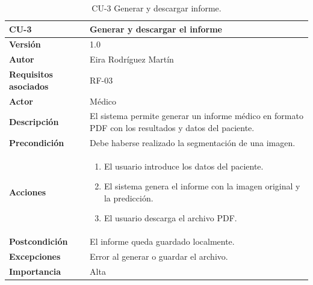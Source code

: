 \begin{table}[!h]
	\centering
	\begin{tabularx}{\linewidth}{ p{} p{} }
		\toprule
		\textbf{CU-3}    & \textbf{Generar y descargar el informe}\\
		\toprule
		\textbf{Versión}              & 1.0    \\
		\textbf{Autor}                & Eira Rodríguez Martín \\
		\textbf{Requisitos asociados} & RF-03 \\
        \textbf{Actor}                & Médico \\
		\textbf{Descripción}          & El sistema permite generar un informe médico en formato PDF con los resultados y datos del paciente.\\
		\textbf{Precondición}         & Debe haberse realizado la segmentación de una imagen. \\
		\textbf{Acciones}             &
		\begin{enumerate}
			\def\labelenumi{\arabic{enumi}.}
			\tightlist
			\item El usuario introduce los datos del paciente.
			\item El sistema genera el informe con la imagen original y la predicción.
            \item El usuario descarga el archivo PDF.
		\end{enumerate}\\
		\textbf{Postcondición}        & El informe queda guardado localmente. \\
		\textbf{Excepciones}          & Error al generar o guardar el archivo. \\
		\textbf{Importancia}          & Alta \\
		\bottomrule
	\end{tabularx}
	\caption{CU-3 Generar y descargar informe.}
\end{table}

